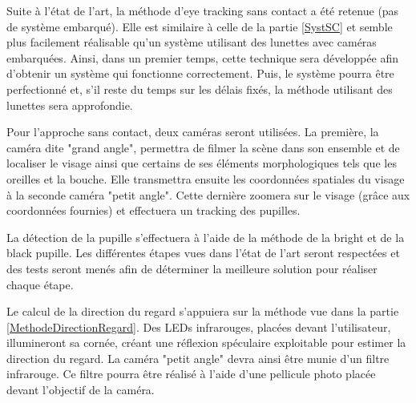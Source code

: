 Suite à l’état de l’art, la méthode d’eye tracking sans contact a été retenue (pas de système embarqué). Elle est similaire à celle de la partie \ref{SystSC} et semble plus facilement réalisable qu'un système utilisant des lunettes avec caméras embarquées. Ainsi, dans un premier temps, cette technique sera développée afin d’obtenir un système qui fonctionne correctement. Puis, le système pourra être perfectionné et, s’il reste du temps sur les délais fixés, la méthode utilisant des lunettes sera approfondie. 

Pour l'approche sans contact, deux caméras seront utilisées. La première, la caméra dite "grand angle", permettra de filmer la scène dans son ensemble et de localiser le visage ainsi que certains de ses éléments morphologiques tels que les oreilles et la bouche. Elle transmettra ensuite les coordonnées spatiales du visage à la seconde caméra "petit angle". Cette dernière zoomera sur le visage (grâce aux coordonnées fournies) et effectuera un tracking des pupilles.  

La détection de la pupille s’effectuera à l’aide de la méthode de la bright et de la black pupille. Les différentes étapes vues dans l’état de l’art seront respectées et des tests seront menés afin de déterminer la meilleure solution pour réaliser chaque étape.
 
Le calcul de la direction du regard s’appuiera sur la méthode vue dans la partie \ref{MethodeDirectionRegard}. Des LEDs infrarouges, placées devant l’utilisateur, illumineront sa cornée, créant une réflexion spéculaire exploitable pour estimer la direction du regard. La caméra "petit angle" devra ainsi être munie d’un filtre infrarouge. Ce filtre pourra être réalisé à l’aide d’une pellicule photo placée devant l’objectif de la caméra.  